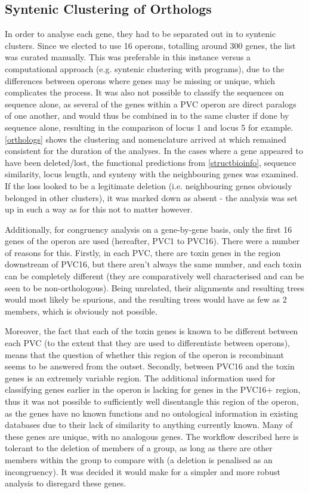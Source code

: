 \subsection{Syntenic Clustering of Orthologs}\label{clustering}
In order to analyse each gene, they had to be separated out in to syntenic clusters. Since we elected to use 16 operons, totalling around 300 genes, the list was curated manually. This was preferable in this instance versus a computational approach (e.g. syntenic clustering with programs), due to the differences between operons where genes may be missing or unique, which complicates the process. It was also not possible to classify the sequences on sequence alone, as several of the genes within a PVC operon are direct paralogs of one another, and would thus be combined in to the same cluster if done by sequence alone, resulting in the comparison of locus 1 and locus 5 for example. \vref{orthologs} shows the clustering and nomenclature arrived at which remained consistent for the duration of the analyses. In the cases where a gene appeared to have been deleted/lost, the functional predictions from \vref{structbioinfo}, sequence similarity, locus length, and synteny with the neighbouring genes was examined. If the loss looked to be a legitimate deletion (i.e. neighbouring genes obviously belonged in other clusters), it was marked down as absent - the analysis was set up in such a way as for this not to matter however.

Additionally, for congruency analysis on a gene-by-gene basis, only the first 16 genes of the operon are used (hereafter, PVC1 to PVC16). There were a number of reasons for this. Firstly, in each PVC, there are toxin genes in the region downstream of PVC16, but there aren't always the same number, and each toxin can be completely different (they are comparatively well characterised and can be seen to be non-orthologous). Being unrelated, their alignments and resulting trees would most likely be spurious, and the resulting trees would have as few as 2 members, which is obviously not possible.

Moreover, the fact that each of the toxin genes is known to be different between each PVC (to the extent that they are used to differentiate between operons), means that the question of whether this region of the operon is recombinant seems to be answered from the outset. Secondly, between PVC16 and the toxin genes is an extremely variable region. The additional information used for classifying genes earlier in the operon is lacking for genes in the PVC16+ region, thus it was not possible to sufficiently well disentangle this region of the operon, as the genes have no known functions and no ontological information in existing databases due to their lack of similarity to anything currently known.
Many of these genes are unique, with no analogous genes. The workflow described here is tolerant to the deletion of members of a group, as long as there are other members within the group to compare with (a deletion is penalised as an incongruency). It was decided it would make for a simpler and more robust analysis to disregard these genes. 

